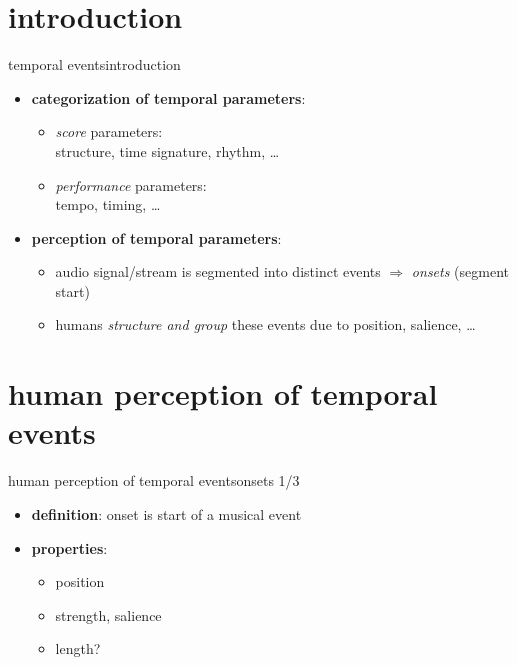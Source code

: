     \section[intro]{introduction}
        \begin{frame}{temporal events}{introduction}
            \begin{itemize}
                \item  \textbf{categorization of temporal parameters}:
                    \begin{itemize}
                        \item	\textit{score} parameters:\\ structure, time signature, rhythm, \ldots
                        \item	\textit{performance} parameters:\\ tempo, timing, \ldots
                    \end{itemize}
                \bigskip
                \item<2->   \textbf{perception of temporal parameters}:
                    \begin{itemize}
                        \item	audio signal/stream is segmented into distinct events $\Rightarrow$ \textit{onsets} (segment start)
                        \item	humans \textit{structure and group} these events due to position, salience, \ldots
                    \end{itemize}
            \end{itemize}
        \end{frame}

    \section[perception]{human perception of temporal events}
        \begin{frame}{human perception of temporal events}{onsets 1/3}
            \begin{itemize}
                \item   \textbf{definition}: onset is start of a musical event
                \item<2->   \textbf{properties}:
                    \begin{itemize}
                        \item<3->	position
                        \item<3->	strength, salience
                        \item<3->	length?
                    \end{itemize}
            \end{itemize}
        \end{frame}

